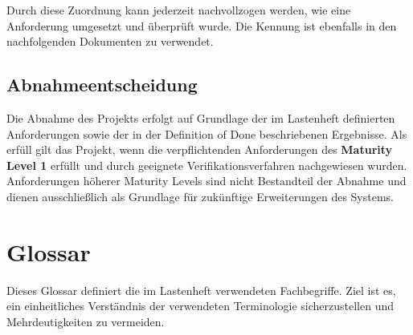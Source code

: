Durch diese Zuordnung kann jederzeit nachvollzogen werden, wie eine
Anforderung umgesetzt und überprüft wurde. Die Kennung ist ebenfalls in
den nachfolgenden Dokumenten zu verwendet.

\subsection{Abnahmeentscheidung}\label{abnahmeentscheidung}

Die Abnahme des Projekts erfolgt auf Grundlage der im Lastenheft
definierten Anforderungen sowie der in der Definition of Done
beschriebenen Ergebnisse. Als erfüll gilt das Projekt, wenn die
verpflichtenden Anforderungen des \textbf{Maturity Level 1} erfüllt und
durch geeignete Verifikationsverfahren nachgewiesen wurden.
Anforderungen höherer Maturity Levels sind nicht Bestandteil der Abnahme
und dienen ausschließlich als Grundlage für zukünftige Erweiterungen des
Systems.

\section{Glossar}\label{glossar}

Dieses Glossar definiert die im Lastenheft verwendeten Fachbegriffe.
Ziel ist es, ein einheitliches Verständnis der verwendeten Terminologie
sicherzustellen und Mehrdeutigkeiten zu vermeiden.

